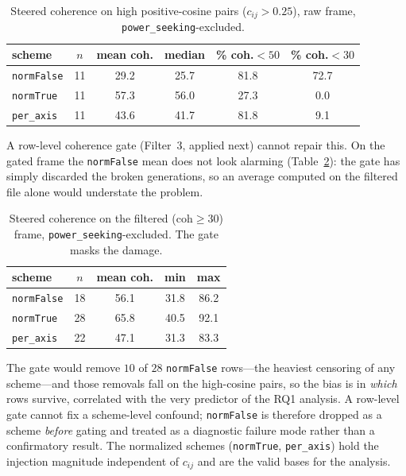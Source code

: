 \begin{table}[h]
  \centering
  \small
  \begin{tabular}{lccccc}
    \toprule
    scheme & $n$ & mean coh. & median & \% coh.${<}50$ & \% coh.${<}30$ \\
    \midrule
    \texttt{normFalse} & 11 & 29.2 & 25.7 & 81.8 & 72.7 \\
    \texttt{normTrue}  & 11 & 57.3 & 56.0 & 27.3 & 0.0  \\
    \texttt{per\_axis} & 11 & 43.6 & 41.7 & 81.8 & 9.1  \\
    \bottomrule
  \end{tabular}
  \caption{Steered coherence on high positive-cosine pairs ($c_{ij}>0.25$),
  raw frame, \texttt{power\_seeking}-excluded.}
  \label{tab:coh-hicos}
\end{table}

A row-level coherence gate (Filter~3, applied next) cannot repair this. On the
gated frame the \texttt{normFalse} mean does not look alarming
(Table~\ref{tab:coh-filtered}): the gate has simply discarded the broken
generations, so an average computed on the filtered file alone would understate
the problem.

\begin{table}[h]
  \centering
  \small
  \begin{tabular}{lcccc}
    \toprule
    scheme & $n$ & mean coh. & min & max \\
    \midrule
    \texttt{normFalse} & 18 & 56.1 & 31.8 & 86.2 \\
    \texttt{normTrue}  & 28 & 65.8 & 40.5 & 92.1 \\
    \texttt{per\_axis} & 22 & 47.1 & 31.3 & 83.3 \\
    \bottomrule
  \end{tabular}
  \caption{Steered coherence on the filtered ($\mathrm{coh}\geq 30$) frame,
  \texttt{power\_seeking}-excluded. The gate masks the damage.}
  \label{tab:coh-filtered}
\end{table}

The gate would remove $10$ of $28$ \texttt{normFalse} rows---the heaviest
censoring of any scheme---and those removals fall on the high-cosine pairs, so
the bias is in \emph{which} rows survive, correlated with the very predictor of
the RQ1 analysis. A row-level gate cannot fix a scheme-level confound;
\texttt{normFalse} is therefore dropped as a scheme \emph{before} gating and
treated as a diagnostic failure mode rather than a confirmatory result. The
normalized schemes (\texttt{normTrue}, \texttt{per\_axis}) hold the injection
magnitude independent of $c_{ij}$ and are the valid bases for the analysis.

